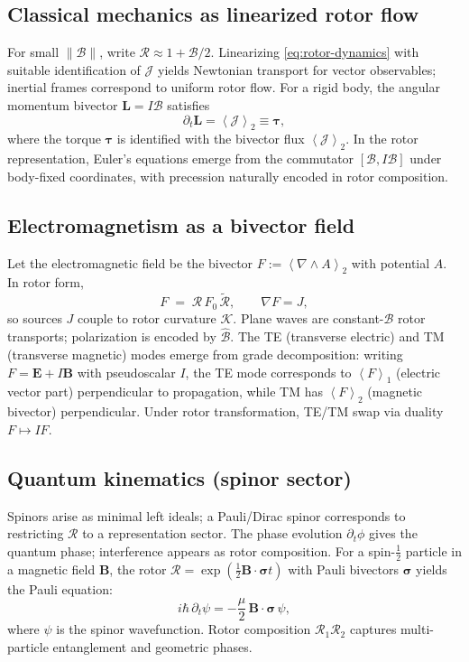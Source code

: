 \documentclass[11pt,a4paper]{article}
\newcommand{\grade}[2]{\left\langle #1 \right\rangle_{#2}}
\newcommand{\vecp}[1]{\grade{#1}{1}}
\newcommand{\biv}[1]{\grade{#1}{2}}
\newcommand{\rev}[1]{\widetilde{#1}}           %
\newcommand{\Rotor}{\mathcal{R}}
\newcommand{\Biv}{\mathcal{B}}
\newcommand{\D}{\nabla}                        %
\theoremstyle{definition}
\theoremstyle{plain}
\theoremstyle{remark}
\begin{document}
\subsection{Classical mechanics as linearized rotor flow}
For small $\|\Biv\|$, write $\Rotor \approx 1+\Biv/2$. Linearizing \eqref{eq:rotor-dynamics} with suitable identification of $\mathcal{J}$ yields Newtonian transport for vector observables; inertial frames correspond to uniform rotor flow. For a rigid body, the angular momentum bivector $\bm{L}=I\Biv$ satisfies
\begin{equation}
  \partial_t \bm{L} = \biv{\mathcal{J}} \equiv \bm{\tau},
\end{equation}
where the torque $\bm{\tau}$ is identified with the bivector flux $\biv{\mathcal{J}}$. In the rotor representation, Euler's equations emerge from the commutator $[\Biv, I\Biv]$ under body-fixed coordinates, with precession naturally encoded in rotor composition.

\subsection{Electromagnetism as a bivector field}
Let the electromagnetic field be the bivector $F:=\biv{\D\wedge A}$ with potential $A$. In rotor form,
\begin{equation}
  F \;=\; \Rotor\, F_0\, \rev{\Rotor}, 
  \qquad
  \D F = J,
\end{equation}
so sources $J$ couple to rotor curvature $\mathcal{K}$. Plane waves are constant-$\Biv$ rotor transports; polarization is encoded by $\hat{\Biv}$. The TE (transverse electric) and TM (transverse magnetic) modes emerge from grade decomposition: writing $F = \bm{E} + I\bm{B}$ with pseudoscalar $I$, the TE mode corresponds to $\vecp{F}$ (electric vector part) perpendicular to propagation, while TM has $\biv{F}$ (magnetic bivector) perpendicular. Under rotor transformation, TE/TM swap via duality $F \mapsto IF$.

\subsection{Quantum kinematics (spinor sector)}
Spinors arise as minimal left ideals; a Pauli/Dirac spinor corresponds to restricting $\Rotor$ to a representation sector. The phase evolution $\partial_t \phi$ gives the quantum phase; interference appears as rotor composition. For a spin-$\tfrac{1}{2}$ particle in a magnetic field $\bm{B}$, the rotor $\Rotor = \exp(\tfrac{1}{2}\bm{B}\cdot\bm{\sigma} t)$ with Pauli bivectors $\bm{\sigma}$ yields the Pauli equation:
\begin{equation}
  i\hbar\, \partial_t \psi = -\frac{\mu}{2}\, \bm{B}\cdot\bm{\sigma}\, \psi,
\end{equation}
where $\psi$ is the spinor wavefunction. Rotor composition $\Rotor_1 \Rotor_2$ captures multi-particle entanglement and geometric phases.
\end{document}

